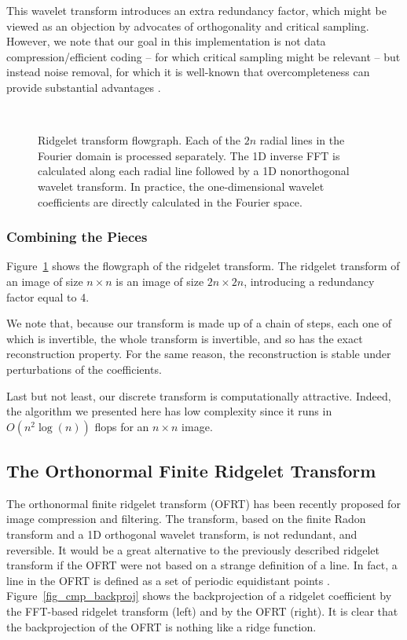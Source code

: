 This wavelet transform introduces an extra redundancy factor, which
might be viewed as an objection by advocates of orthogonality
and critical sampling. However,
we note that our goal in this implementation is not data
compression/efficient
coding -- for which critical sampling might be relevant -- but
instead
noise removal, for which it is well-known that overcompleteness
can provide substantial advantages
\cite{rest:donoho95}.

\begin{figure}[htb]
\centerline{
\hbox{
}}
\caption{Ridgelet transform flowgraph. Each of the $2n$  radial lines
      in the Fourier domain is processed separately. The 1D inverse FFT
      is calculated along each radial line followed by a 1D nonorthogonal
      wavelet transform.  In practice, the one-dimensional wavelet
      coefficients are directly calculated in the Fourier space. }
\label{fig_ridgelet}
\end{figure}

\subsubsection{Combining the Pieces}

Figure~\ref{fig_ridgelet} shows the flowgraph of the ridgelet
transform.  The ridgelet transform of an image of size $n \times n$ is
an image of size $2n \times 2n$, introducing a redundancy factor
equal to 4.

We note that, because our transform is made up of a chain
of steps, each one of which is invertible, the whole
transform is invertible, and so has the
exact reconstruction property. For the same
reason, the reconstruction
is stable under perturbations of the coefficients.

Last but not least, our discrete transform is computationally
attractive. Indeed, the algorithm we presented here has low complexity
since it runs in $O(n^2\log(n))$ flops for an $n \times n$ image.

\subsection{The Orthonormal Finite Ridgelet Transform}
The orthonormal finite ridgelet transform (OFRT)  has been 
recently proposed  
\cite{cur:do00,cur:do00b} for image compression and filtering. 
The transform, based on the finite Radon transform \cite{cur:matus93} and
a 1D orthogonal wavelet transform, is not redundant, and reversible.
It would be a great alternative to the previously described ridgelet transform
if the OFRT were not based on a strange definition 
of a line. In fact, a line in the OFRT is defined as 
a set of periodic equidistant points \cite{cur:matus93}. 
Figure~\ref{fig_cmp_backproj} shows the backprojection of a ridgelet 
coefficient by the FFT-based ridgelet transform (left) and by the 
 OFRT (right). It is clear that the backprojection
of the  OFRT is nothing like a ridge function.

